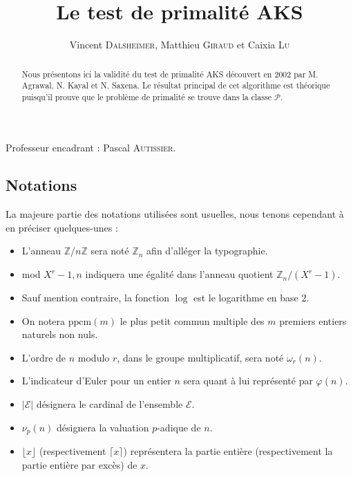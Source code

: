 \documentclass[11pt]{article}
\title{\textbf{Le test de primalité AKS}}
\author{Vincent \textsc{Dalsheimer}, Matthieu \textsc{Giraud} et Caixia \textsc{Lu}}
\date{}
\newcommand{\ppcm}{\mathrm{ppcm}}
\begin{document}
\maketitle

\begin{center}
Professeur encadrant : Pascal \textsc{Autissier}.
\end{center}

\begin{abstract}
Nous présentons ici la validité du test de primalité AKS découvert en 2002 par  M. Agrawal, N. Kayal et N. Saxena. Le résultat principal de cet algorithme est théorique puisqu'il prouve que le problème de primalité se trouve dans la classe $\mathcal{P}$.
\end{abstract}

\tableofcontents

\newpage

\vspace*{\fill}
\begin{minipage}{14cm}
\begin{center}
\section*{Notations}
\end{center}
La majeure partie des notations utilisées sont usuelles, nous tenons cependant à en préciser quelques-unes :
\begin{itemize}
\item L'anneau $\mathbb{Z}/n\mathbb{Z}$ sera noté $\mathbb{Z}_{n}$ afin d'alléger la typographie.
\item mod $X^r-1,n$ indiquera une égalité dans l'anneau quotient $\mathbb{Z}_n/(X^r-1)$.
\item Sauf mention contraire, la fonction $\log$ est le logarithme en base $2$.
\item On notera $\ppcm(m)$ le plus petit commun multiple des $m$ premiers entiers naturels non nuls.
\item L'ordre de $n$ modulo $r$, dans le groupe multiplicatif, sera noté $\omega_{r}(n)$.
\item L'indicateur d'Euler pour un entier $n$ sera quant à lui représenté par $\varphi(n)$.
\item $\vert \mathcal{E} \vert$ désignera le cardinal de l'ensemble $\mathcal{E}$.
\item $\nu_{p}(n)$ désignera la valuation $p$-adique de $n$.
\item $\lfloor x \rfloor$ (respectivement $\lceil x \rceil$) représentera la partie entière (respectivement la partie entière par excès) de $x$.
\end{itemize}
\end{minipage}
\vspace*{\fill}
\end{document}
